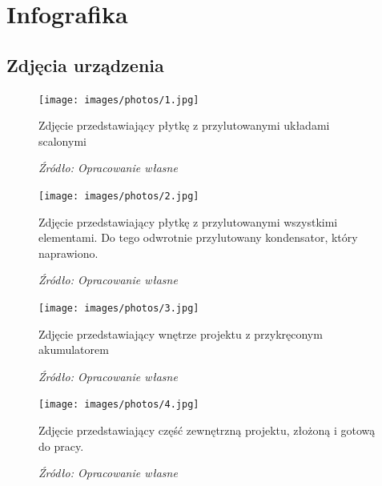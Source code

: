 \documentclass[12pt,a4paper,oneside]{memoir}
\begin{document}
\chapter{Infografika} 
\section{Zdjęcia urządzenia}
\begin{figure} [!h]
	\centering
	\texttt{[image: images/photos/1.jpg]}
	{\tytulyrozdzialow \footnotesize \caption[Zdjęcie - układy scalone] {Zdjęcie przedstawiający płytkę z przylutowanymi układami scalonymi}}
	\caption*{\textit{Źródło: Opracowanie własne}}
\end{figure}
\begin{figure} [!h]
	\centering
	\texttt{[image: images/photos/2.jpg]}
	{\tytulyrozdzialow \footnotesize \caption[Zdjęcie - ukończona płytka] {Zdjęcie przedstawiający płytkę z przylutowanymi wszystkimi elementami. Do tego odwrotnie przylutowany kondensator, który naprawiono.}}
	\caption*{\textit{Źródło: Opracowanie własne}}
\end{figure}
\begin{figure} [!h]
	\centering
	\texttt{[image: images/photos/3.jpg]}
	{\tytulyrozdzialow \footnotesize \caption[Zdjęcie - wnętrze projektu] {Zdjęcie przedstawiający wnętrze projektu z przykręconym akumulatorem}}
	\caption*{\textit{Źródło: Opracowanie własne}}
\end{figure}
\begin{figure} [!h]
	\centering
	\texttt{[image: images/photos/4.jpg]}
	{\tytulyrozdzialow \footnotesize \caption[Zdjęcie - wygląd projektu] {Zdjęcie przedstawiający część zewnętrzną projektu, złożoną i gotową do pracy.}}
	\caption*{\textit{Źródło: Opracowanie własne}}
\end{figure}
\end{document}
